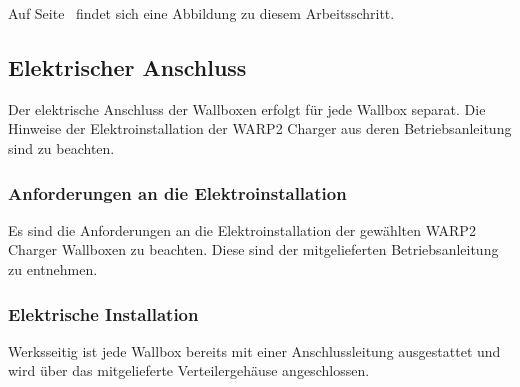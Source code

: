 \documentclass[a4paper,10pt]{article}
\begin{document}
\begin{multicols*}{2}
	Auf Seite~\pageref{appendix_erection} findet sich eine
	Abbildung zu diesem Arbeitsschritt.

	\subsection{Elektrischer Anschluss}
	Der elektrische Anschluss der Wallboxen erfolgt für jede Wallbox separat.
	Die Hinweise der Elektroinstallation der WARP2 Charger aus deren
	Betriebsanleitung sind zu beachten.

	\subsubsection{Anforderungen an die Elektroinstallation}
	Es sind die Anforderungen an die Elektroinstallation der gewählten WARP2
	Charger Wallboxen zu beachten. Diese sind der mitgelieferten
	Betriebsanleitung zu entnehmen.

	\subsubsection{Elektrische Installation}
	Werksseitig ist jede Wallbox bereits mit einer Anschlussleitung
	ausgestattet und wird über das mitgelieferte Verteilergehäuse
	angeschlossen.


\end{multicols*}
\end{document}
